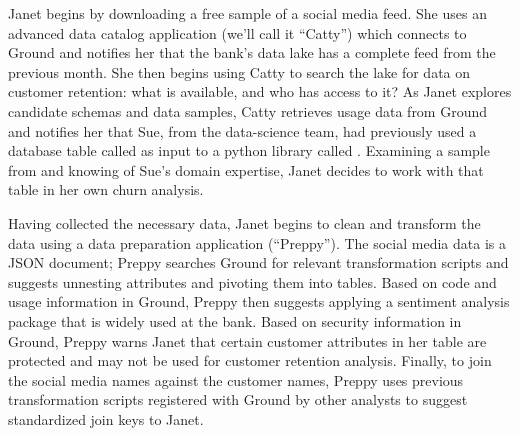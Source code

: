 \documentclass{sig-alternate}
\begin{document}
Janet 
begins by downloading a free sample of a social media feed.
She uses an advanced data catalog application (we'll call it ``Catty'') which connects to Ground 
and notifies her that the bank's data lake has a complete feed from the previous month. 
She then begins using Catty to search the lake for data on customer retention: what is available, and who has access to it?  
As Janet explores candidate schemas and data samples, Catty retrieves usage data from Ground and notifies her that Sue, from the data-science team, had previously used a database table called  as input to a python library called .
Examining a sample from  and knowing of Sue's domain expertise, Janet decides to work with that table in her own churn analysis.  

Having collected the necessary data, Janet begins to clean and transform the data using a data preparation application (``Preppy''). 
The social media data is a JSON document; Preppy searches Ground for relevant transformation scripts and suggests unnesting attributes and pivoting them into tables.
Based on code and usage information in Ground, Preppy then suggests applying a sentiment analysis package that is widely used at the bank. %
Based on security information in Ground, Preppy warns Janet that certain customer attributes in her table are protected and may not be used for customer retention analysis.
Finally, to join the social media names against the customer names, Preppy uses previous transformation scripts registered with Ground by other analysts to suggest standardized join keys to Janet.
\end{document}
